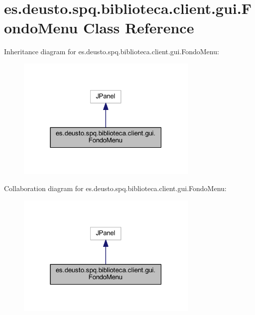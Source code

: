 \hypertarget{classes_1_1deusto_1_1spq_1_1biblioteca_1_1client_1_1gui_1_1_fondo_menu}{}\section{es.\+deusto.\+spq.\+biblioteca.\+client.\+gui.\+Fondo\+Menu Class Reference}
\label{classes_1_1deusto_1_1spq_1_1biblioteca_1_1client_1_1gui_1_1_fondo_menu}


Inheritance diagram for es.\+deusto.\+spq.\+biblioteca.\+client.\+gui.\+Fondo\+Menu\+:
\nopagebreak
\begin{figure}[H]
\begin{center}
\leavevmode
\includegraphics[width=247pt]{classes_1_1deusto_1_1spq_1_1biblioteca_1_1client_1_1gui_1_1_fondo_menu__inherit__graph}
\end{center}
\end{figure}


Collaboration diagram for es.\+deusto.\+spq.\+biblioteca.\+client.\+gui.\+Fondo\+Menu\+:
\nopagebreak
\begin{figure}[H]
\begin{center}
\leavevmode
\includegraphics[width=247pt]{classes_1_1deusto_1_1spq_1_1biblioteca_1_1client_1_1gui_1_1_fondo_menu__coll__graph}
\end{center}
\end{figure}
